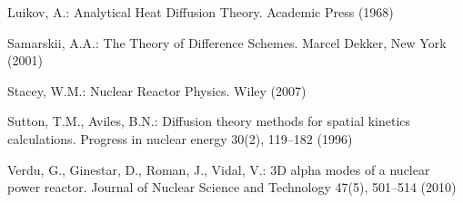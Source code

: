\documentclass{llncs}
\begin{document}
\begin{thebibliography}{35}
Luikov, A.: Analytical Heat Diffusion Theory. Academic Press (1968)

Samarskii, A.A.: The Theory of Difference Schemes. Marcel Dekker, New York
  (2001)

Stacey, W.M.: Nuclear Reactor Physics. Wiley (2007)

Sutton, T.M., Aviles, B.N.: Diffusion theory methods for spatial kinetics
  calculations. Progress in nuclear energy  30(2),  119--182 (1996)

Verdu, G., Ginestar, D., Roman, J., Vidal, V.: {3D} alpha modes of a nuclear
  power reactor. Journal of Nuclear Science and Technology  47(5),  501--514
  (2010)

\end{thebibliography}
 
\end{document}
